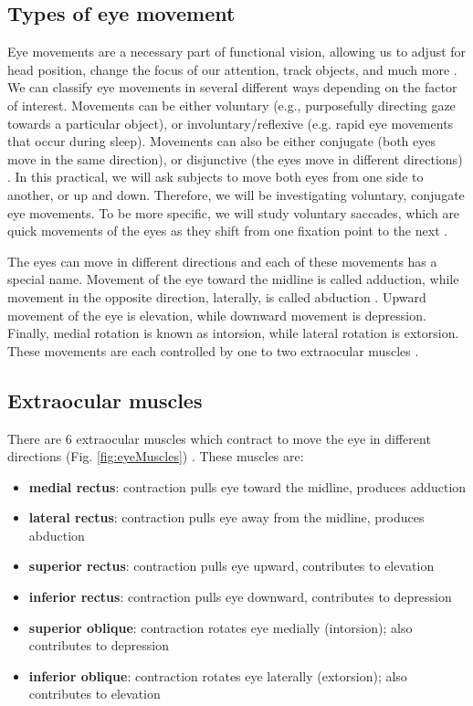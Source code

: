 \documentclass[12pt]{article}
\begin{document}
\subsection*{Types of eye movement}

Eye movements are a necessary part of functional vision, allowing us to adjust for head position, change the focus of our attention, track objects, and much more \cite{foulsham2015eye,schor2011neural}. We can classify eye movements in several different ways depending on the factor of interest. Movements can be either voluntary (e.g., purposefully directing gaze towards a particular object), or involuntary/reflexive (e.g. rapid eye movements that occur during sleep). Movements can also be either conjugate (both eyes move in the same direction), or disjunctive (the eyes move in different directions) \cite{mather2016foundations}. In this practical, we will ask subjects to move both eyes from one side to another, or up and down. Therefore, we will be investigating voluntary, conjugate eye movements. To be more specific, we will study voluntary saccades, which are quick movements of the eyes as they shift from one fixation point to the next \cite{mather2016foundations}.

The eyes can move in different directions and each of these movements has a special name. Movement of the eye toward the midline is called adduction, while movement in the opposite direction, laterally, is called abduction \cite{purves2001editors}. Upward movement of the eye is elevation, while downward movement is depression. Finally, medial rotation is known as 
intorsion, while lateral rotation is extorsion. These movements are each controlled by one to two extraocular muscles \cite{purves2001editors}.

\subsection*{Extraocular muscles}

There are 6 extraocular muscles which contract to move the eye in different directions (Fig. \ref{fig:eyeMuscles}) \cite{openStax2017sensory}. These muscles are:

\vspace{0.3cm}

\begin{itemize}
\item \textbf{medial rectus}: contraction pulls eye toward the midline, produces adduction
\item \textbf{lateral rectus}: contraction pulls eye away from the midline, produces abduction
\item \textbf{superior rectus}: contraction pulls eye upward, contributes to elevation
\item \textbf{inferior rectus}: contraction pulls eye downward, contributes to depression
\item \textbf{superior oblique}: contraction rotates eye medially (intorsion); also contributes to depression 
\item \textbf{inferior oblique}: contraction rotates eye laterally (extorsion); also contributes to elevation
\end{itemize}
\end{document}
